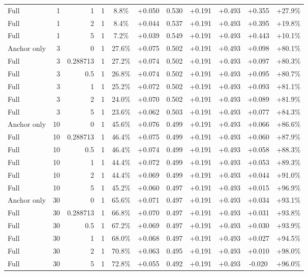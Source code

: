 \begin{table}[htbp]
\begin{tabular}{lrrrccccccc}
Full & 1 & 1 & 1 & 8.8\% & +0.050 & 0.530 & +0.191 & +0.493 & +0.355 & +27.9\% \\
Full & 1 & 2 & 1 & 8.4\% & +0.044 & 0.537 & +0.191 & +0.493 & +0.395 & +19.8\% \\
Full & 1 & 5 & 1 & 7.2\% & +0.039 & 0.549 & +0.191 & +0.493 & +0.443 & +10.1\% \\
Anchor only & 3 & 0 & 1 & 27.6\% & +0.075 & 0.502 & +0.191 & +0.493 & +0.098 & +80.1\% \\
Full & 3 & 0.288713 & 1 & 27.2\% & +0.074 & 0.502 & +0.191 & +0.493 & +0.097 & +80.3\% \\
Full & 3 & 0.5 & 1 & 26.8\% & +0.074 & 0.502 & +0.191 & +0.493 & +0.095 & +80.7\% \\
Full & 3 & 1 & 1 & 25.2\% & +0.072 & 0.502 & +0.191 & +0.493 & +0.093 & +81.1\% \\
Full & 3 & 2 & 1 & 24.0\% & +0.070 & 0.502 & +0.191 & +0.493 & +0.089 & +81.9\% \\
Full & 3 & 5 & 1 & 23.6\% & +0.062 & 0.503 & +0.191 & +0.493 & +0.077 & +84.3\% \\
Anchor only & 10 & 0 & 1 & 45.6\% & +0.076 & 0.499 & +0.191 & +0.493 & +0.066 & +86.6\% \\
Full & 10 & 0.288713 & 1 & 46.4\% & +0.075 & 0.499 & +0.191 & +0.493 & +0.060 & +87.9\% \\
Full & 10 & 0.5 & 1 & 46.4\% & +0.074 & 0.499 & +0.191 & +0.493 & +0.058 & +88.3\% \\
Full & 10 & 1 & 1 & 44.4\% & +0.072 & 0.499 & +0.191 & +0.493 & +0.053 & +89.3\% \\
Full & 10 & 2 & 1 & 44.4\% & +0.069 & 0.499 & +0.191 & +0.493 & +0.044 & +91.0\% \\
Full & 10 & 5 & 1 & 45.2\% & +0.060 & 0.497 & +0.191 & +0.493 & +0.015 & +96.9\% \\
Anchor only & 30 & 0 & 1 & 65.6\% & +0.071 & 0.497 & +0.191 & +0.493 & +0.034 & +93.1\% \\
Full & 30 & 0.288713 & 1 & 66.8\% & +0.070 & 0.497 & +0.191 & +0.493 & +0.031 & +93.8\% \\
Full & 30 & 0.5 & 1 & 67.2\% & +0.069 & 0.497 & +0.191 & +0.493 & +0.030 & +93.9\% \\
Full & 30 & 1 & 1 & 68.0\% & +0.068 & 0.497 & +0.191 & +0.493 & +0.027 & +94.5\% \\
Full & 30 & 2 & 1 & 70.8\% & +0.063 & 0.495 & +0.191 & +0.493 & +0.010 & +98.0\% \\
Full & 30 & 5 & 1 & 72.8\% & +0.055 & 0.492 & +0.191 & +0.493 & -0.020 & +96.0\% \\

\end{tabular}
\end{table}

